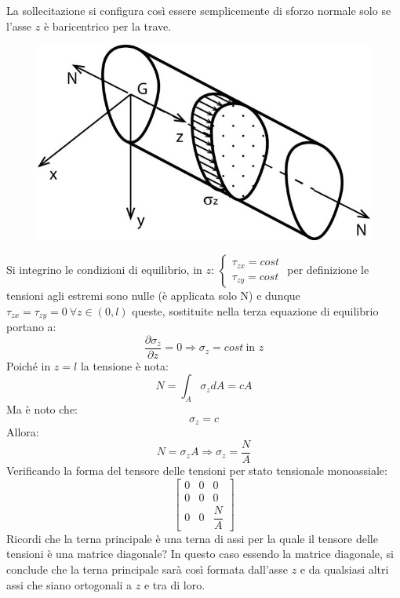  	La sollecitazione si configura così essere semplicemente di sforzo normale solo se l’asse $ z $ è baricentrico per la trave.
 	\begin{figure}[H]
 		\centering
 		\includegraphics[width=0.5\linewidth]{Immagini_2/screenshot005}
 		\label{fig:screenshot005}
 	\end{figure}	
 	Si integrino le condizioni di equilibrio, in $z$: $\begin{cases}
 		\tau_{zx} = cost \\
 		\tau_{zy} = cost 
 	\end{cases}$ \newline per definizione le tensioni agli estremi sono nulle (è applicata solo N) e dunque \newline $\tau_{zx} = \tau_{zy} = 0 ~ \forall z  \in  (0,l)$ queste, sostituite nella terza equazione di equilibrio portano a:
 \[ \dfrac{\partial\sigma_z}{\partial z} = 0 \Rightarrow \sigma_z = cost ~ \text{in $z$}\] 
 	Poiché in $z=l$ la tensione è nota:
 \[ 	N = \int_A \sigma_zdA = cA \]
	 Ma è noto che: \[ \sigma_z = c\] Allora:  \[N  = \sigma_zA \Rightarrow \sigma_z = \frac{N}{A} \] Verificando la forma del tensore delle tensioni per stato tensionale monoassiale:
 \begin{equation}
 \boxed{	\left[ \begin{array}{ccc}
 	0 & 0 & 0 \\
 	0 & 0 & 0 \\
 	0 & 0 & \dfrac{N}{A}
 \end{array}\right]} 
 \end{equation}
 	Ricordi che la terna principale è una terna di assi per la quale il tensore delle
 	tensioni è una matrice diagonale? In questo caso essendo la matrice diagonale, si conclude che la terna principale sarà così formata dall'asse $z$ e da qualsiasi altri assi che siano ortogonali a $z$ e tra di loro. \newline

